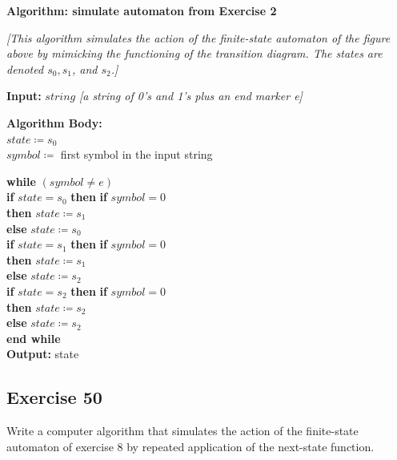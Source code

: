 \documentclass[14pt]{extarticle}
\newcommand{\cy}{\color{cyan}}
\begin{document}
\begin{tcolorbox}[colframe=cyan]
    {\bf \cy Algorithm: simulate automaton from Exercise 2}

    {\it [This algorithm simulates the action of the finite-state automaton of the figure above by mimicking the functioning of
            the transition diagram. The states are denoted \(s_0, s_1\), and \(s_2\).]}

    {\bf Input:} \(string\) {\it [a string of 0’s and 1’s plus an end marker e]}

        {\bf Algorithm Body:} \\
    \(state \coloneqq s_0\) \\
    \(symbol \coloneqq\) first symbol in the input string

    \begin{tabbing}
        {\bf while} \= \((symbol \neq e)\) \\
        \> {\bf if} \(state = s_0\) {\bf then} \= {\bf if} \(symbol = 0\) \\
        \>                                     \> {\bf then} \(state \coloneqq s_1\) \\
        \>                                     \> {\bf else} \(state \coloneqq s_0\) \\
        \> {\bf if} \(state = s_1\) {\bf then} \= {\bf if} \(symbol = 0\) \\
        \>                                     \> {\bf then} \(state \coloneqq s_1\) \\
        \>                                     \> {\bf else} \(state \coloneqq s_2\) \\
        \> {\bf if} \(state = s_2\) {\bf then} \= {\bf if} \(symbol = 0\) \\
        \>                                     \> {\bf then} \(state \coloneqq s_2\) \\
        \>                                     \> {\bf else} \(state \coloneqq s_2\) \\
        {\bf end while} \\
        {\bf Output:} state
    \end{tabbing}
\end{tcolorbox}

\subsection{Exercise 50}
Write a computer algorithm that simulates the action of the finite-state automaton of exercise 8 by repeated application
of the next-state function.
\end{document}
